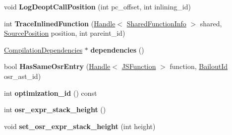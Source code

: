 \begin{DoxyCompactItemize}
\item 
void {\bfseries Log\+Deopt\+Call\+Position} (int pc\+\_\+offset, int inlining\+\_\+id)\hypertarget{classv8_1_1internal_1_1_compilation_info_ad28fb071f5d90b3ce55d09c8bddd7915}{}\label{classv8_1_1internal_1_1_compilation_info_ad28fb071f5d90b3ce55d09c8bddd7915}

\item 
int {\bfseries Trace\+Inlined\+Function} (\hyperlink{classv8_1_1internal_1_1_handle}{Handle}$<$ \hyperlink{classv8_1_1internal_1_1_shared_function_info}{Shared\+Function\+Info} $>$ shared, \hyperlink{classv8_1_1internal_1_1_source_position}{Source\+Position} position, int pareint\+\_\+id)\hypertarget{classv8_1_1internal_1_1_compilation_info_a6fec3d5194222cf3c2b9fd76e8e09e60}{}\label{classv8_1_1internal_1_1_compilation_info_a6fec3d5194222cf3c2b9fd76e8e09e60}

\item 
\hyperlink{classv8_1_1internal_1_1_compilation_dependencies}{Compilation\+Dependencies} $\ast$ {\bfseries dependencies} ()\hypertarget{classv8_1_1internal_1_1_compilation_info_a0de9689df61c231804c72aa9f93fb87a}{}\label{classv8_1_1internal_1_1_compilation_info_a0de9689df61c231804c72aa9f93fb87a}

\item 
bool {\bfseries Has\+Same\+Osr\+Entry} (\hyperlink{classv8_1_1internal_1_1_handle}{Handle}$<$ \hyperlink{classv8_1_1internal_1_1_j_s_function}{J\+S\+Function} $>$ function, \hyperlink{classv8_1_1internal_1_1_bailout_id}{Bailout\+Id} osr\+\_\+ast\+\_\+id)\hypertarget{classv8_1_1internal_1_1_compilation_info_aa5cfd2659137f69732afb039fdac49b0}{}\label{classv8_1_1internal_1_1_compilation_info_aa5cfd2659137f69732afb039fdac49b0}

\item 
int {\bfseries optimization\+\_\+id} () const \hypertarget{classv8_1_1internal_1_1_compilation_info_a30b55d1964eed6b6ac7c5cb49f2aac5d}{}\label{classv8_1_1internal_1_1_compilation_info_a30b55d1964eed6b6ac7c5cb49f2aac5d}

\item 
int {\bfseries osr\+\_\+expr\+\_\+stack\+\_\+height} ()\hypertarget{classv8_1_1internal_1_1_compilation_info_a55249637346ccc684e1f966f71d17b7c}{}\label{classv8_1_1internal_1_1_compilation_info_a55249637346ccc684e1f966f71d17b7c}

\item 
void {\bfseries set\+\_\+osr\+\_\+expr\+\_\+stack\+\_\+height} (int height)\hypertarget{classv8_1_1internal_1_1_compilation_info_af42638e033c5b20a5a0be4e3d76c0b36}{}\label{classv8_1_1internal_1_1_compilation_info_af42638e033c5b20a5a0be4e3d76c0b36}


\end{DoxyCompactItemize}

